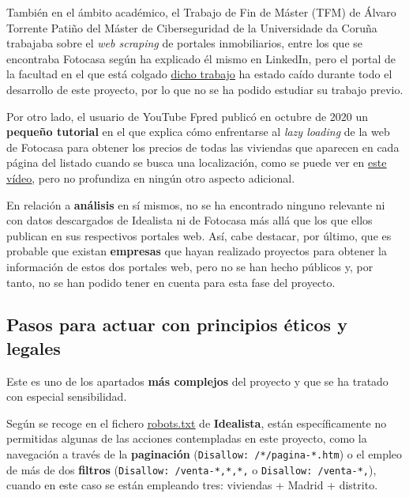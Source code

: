 \documentclass[12pt]{article}
\begin{document}
También en el ámbito académico, el Trabajo de Fin de Máster (TFM) de Álvaro Torrente Patiño del Máster de Ciberseguridad de la Universidade da Coruña trabajaba sobre el \textit{web scraping} de portales inmobiliarios, entre los que se encontraba Fotocasa según ha explicado él mismo en LinkedIn, pero el portal de la facultad en el que está colgado \href{http://castor.det.uvigo.es:8080/xmlui/bitstream/handle/123456789/575/TorrentePatino_Alvaro_TFM_2021.pdf?sequence=1&isAllowed=y}{\underline{dicho trabajo}} ha estado caído durante todo el desarrollo de este proyecto, por lo que no se ha podido estudiar su trabajo previo. 

Por otro lado, el usuario de YouTube Fpred publicó en octubre de 2020 un \textbf{pequeño tutorial} en el que explica cómo enfrentarse al \textit{lazy loading} de la web de Fotocasa para obtener los precios de todas las viviendas que aparecen en cada página del listado cuando se busca una localización, como se puede ver en \href{https://www.youtube.com/watch?v=WMjV7rF3oX8}{\underline{este vídeo}}, pero no profundiza en ningún otro aspecto adicional. 

En relación a \textbf{análisis} en sí mismos, no se ha encontrado ninguno relevante ni con datos descargados de Idealista ni de Fotocasa más allá que los que ellos publican en sus respectivos portales web. Así, cabe destacar, por último, que es probable que existan \textbf{empresas} que hayan realizado proyectos para obtener la información de estos dos portales web, pero no se han hecho públicos y, por tanto, no se han podido tener en cuenta para esta fase del proyecto. 

\vspace{-1.5em}\subsection*{Pasos para actuar con principios éticos y legales}\vspace{-1.0em}

Este es uno de los apartados \textbf{más complejos} del proyecto y que se ha tratado con especial sensibilidad.

Según se recoge en el fichero \href{https://www.idealista.com/robots.txt}{\underline{robots.txt}} de \textbf{Idealista}, están específicamente no permitidas algunas de las acciones contempladas en este proyecto, como la navegación a través de la \textbf{paginación} (\verb|Disallow: /*/pagina-*.htm|) o el empleo de más de dos \textbf{filtros} (\verb|Disallow: /venta-*,*,*,| o \verb|Disallow: /venta-*,|), cuando en este caso se están empleando tres: viviendas + Madrid + distrito. 
\end{document}
